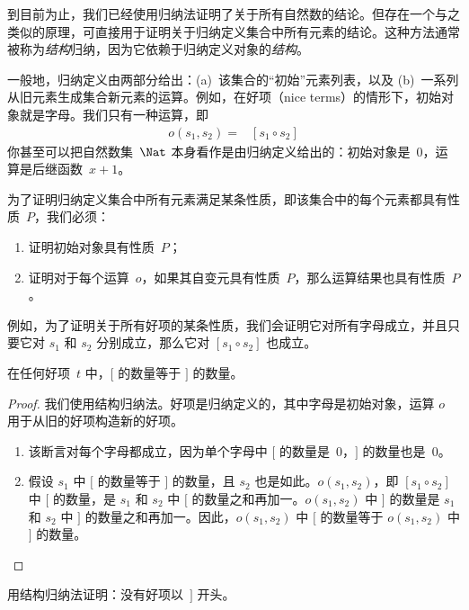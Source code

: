\documentclass[../../../include/open-logic-section]{subfiles}
\begin{document}


到目前为止，我们已经使用归纳法证明了关于所有自然数的结论。但存在一个与之类似的原理，可直接用于证明关于归纳定义集合中所有元素的结论。这种方法通常被称为\emph{结构}归纳，因为它依赖于归纳定义对象的\emph{结构}。

一般地，归纳定义由两部分给出：(a)~该集合的“初始”元素列表，以及 (b)~一系列从旧元素生成集合新元素的运算。例如，在好项（nice terms）的情形下，初始对象就是字母。我们只有一种运算，即 \begin{align*}
  o(s_1, s_2) = & [s_1 \circ s_2]
\end{align*}
你甚至可以把自然数集~$\Nat$ 本身看作是由归纳定义给出的：初始对象是~$0$，运算是后继函数~$x + 1$。

为了证明归纳定义集合中所有元素满足某条性质，即该集合中的每个元素都具有性质~$P$，我们必须：

\begin{enumerate}
\item 证明初始对象具有性质~$P$；
\item 证明对于每个运算~$o$，如果其自变元具有性质~$P$，那么运算结果也具有性质~$P$。
\end{enumerate}

例如，为了证明关于所有好项的某条性质，我们会证明它对所有字母成立，并且只要它对 $s_1$ 和 $s_2$ 分别成立，那么它对 $[s_1 \circ s_2]$ 也成立。

\begin{prop}
  在任何好项~$t$ 中，$[$ 的数量等于 $]$ 的数量。
\end{prop}

\begin{proof}
我们使用结构归纳法。好项是归纳定义的，其中字母是初始对象，运算 $o$ 用于从旧的好项构造新的好项。
\begin{enumerate}
\item 该断言对每个字母都成立，因为单个字母中 $[$ 的数量是~$0$，$]$ 的数量也是~$0$。
\item 假设 $s_1$ 中 $[$ 的数量等于 $]$ 的数量，且 $s_2$ 也是如此。$o(s_1, s_2)$，即 $[s_1 \circ s_2]$ 中 $[$ 的数量，是 $s_1$ 和 $s_2$ 中 $[$ 的数量之和再加一。$o(s_1, s_2)$ 中 $]$ 的数量是 $s_1$ 和 $s_2$ 中 $]$ 的数量之和再加一。因此，$o(s_1, s_2)$ 中 $[$ 的数量等于 $o(s_1,s_2)$ 中 $]$ 的数量。
\end{enumerate}
\end{proof}

\begin{prob}
  用结构归纳法证明：没有好项以~$]$ 开头。
\end{prob}
\end{document}
